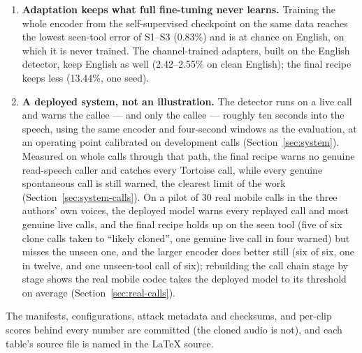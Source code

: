 \begin{enumerate}
    the line and from 36.3\% to 6.0\% over AMR-NB, better in every one of five seeds, with
    no unseen-tool audio in training; every seed beats its shortcut floor on every test set,
    though three of those floors are above chance (Section~\ref{sec:res-final}). A larger encoder fine-tuned in full on the same data is better still,
    and of the three unseen generators, IndicF5 and, for the adapters, Chatterbox show
    where the gap remains (Section~\ref{sec:res-finalssl}).
  \item \textbf{Adaptation keeps what full fine-tuning never learns.} Training the
    whole encoder from the self-supervised checkpoint on the same data reaches the lowest
    seen-tool error of S1--S3 (0.83\%) and is at chance on English, on which it is never
    trained. The channel-trained adapters, built on the English detector, keep English as
    well (2.42--2.55\% on clean English); the final recipe keeps less (13.44\%, one seed).
  \item \textbf{A deployed system, not an illustration.} The detector runs on a live
    call and warns the callee --- and only the callee --- roughly ten seconds into
    the speech, using the same encoder and four-second windows as the evaluation, at an
    operating point calibrated on development calls (Section~\ref{sec:system}). Measured on whole calls through that path, the final
    recipe warns no genuine read-speech caller and catches every Tortoise call, while
    every genuine spontaneous call is still warned, the clearest limit of the work
    (Section~\ref{sec:system-calls}). On a pilot of 30 real mobile calls in the
    three authors' own voices, the deployed model warns every replayed call and most genuine
    live calls, and the final recipe holds up on the seen tool (five of six clone calls
    taken to ``likely cloned'', one genuine live call in four warned) but misses the unseen one,
    and the larger encoder does better still (six of six, one in twelve, and one unseen-tool
    call of six);
    rebuilding the call chain stage by stage shows the real mobile codec takes the deployed model
    to its threshold on average
    (Section~\ref{sec:real-calls}).
\end{enumerate}

The manifests, configurations, attack metadata and checksums, and per-clip scores
behind every number are committed (the cloned audio is not), and each table's source file
is named in the LaTeX source.
